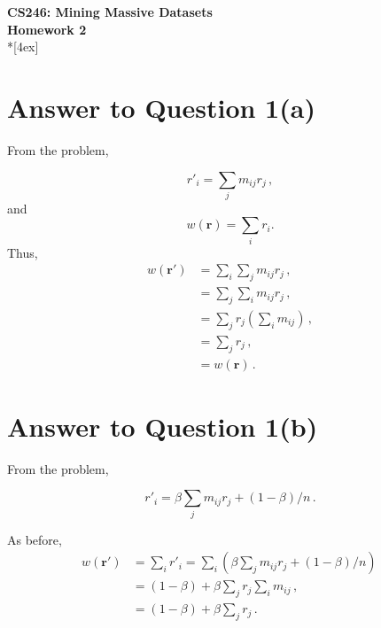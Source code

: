 \documentclass[11pt]{article}
\begin{document}
\thispagestyle{empty}
\parindent 0pt
\vfill
\large

\begin{center}
\LARGE{\bf \textsf{CS246: Mining Massive Datasets}}\\ {\bf \textsf{Homework 2}} 
\\*[4ex]
\end{center}

\section*{Answer to Question 1(a)}

From the problem,

\begin{equation}
    r'_i = \sum_{j} m_{ij} r_j \, ,
\end{equation}
and 
\begin{equation}
    w(\bm{r}) = \sum_i r_i.
\end{equation}
Thus,
\begin{equation}
        \begin{split}
            w(\bm{r}') & = \sum_i \sum_j m_{ij} r_j \,, \\
            & = \sum_j \sum_i m_{ij} r_j \, , \\
            & = \sum_j r_j (\sum_i m_{ij}) \, , \\
            & = \sum_j r_j \, ,\\
            & = w(\bm{r}) \, .
        \end{split}
\end{equation}

\pagebreak[4]
\section*{Answer to Question 1(b)}

From the problem,

\begin{equation}
    r'_i = \beta \sum_j m_{ij} r_j + (1 - \beta) / n \, .
\end{equation}

As before,
\begin{equation}
    \begin{split}
        w(\bm{r}') & = \sum_i r'_i = \sum_i ( \beta \sum_j m_{ij} r_j + (1 - \beta) / n ) \, \\
        & = (1 - \beta) + \beta \sum_j r_j \sum_i m_{ij}  \, , \\
        & = (1 - \beta) + \beta \sum_j r_j \, .
    \end{split}
\end{equation}
\end{document}
